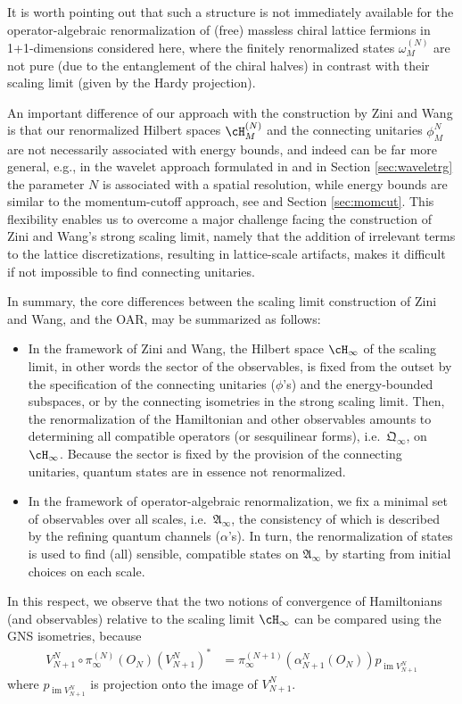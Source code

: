 \documentclass[a4paper, 11pt]{article}
\newcommand{\fA}{\mathfrak{A}}\newcommand{\cA}{\mathcal{A}}\newcommand{\dA}{\mathds{A}}\newcommand{\sA}{\mathscr{A}}
\newcommand{\fQ}{\mathfrak{Q}}
\DeclareMathOperator{\1}{\mathds{1}}
\DeclareMathOperator{\im}{im}
\begin{document}
It is worth pointing out that such a structure is not immediately available for the operator-algebraic renormalization of (free) massless chiral lattice fermions in 1+1-dimensions considered here, where the finitely renormalized states $\omega^{(N)}_{M}$ are not pure (due to the entanglement of the chiral halves) in contrast with their scaling limit (given by the Hardy projection).

An important difference of our approach with the construction by Zini and Wang is that our renormalized Hilbert spaces $\cH_{M}^{(N)}$ and the connecting unitaries $\phi^{N}_{M}$ are not necessarily associated with energy bounds, and indeed can be far more general, e.g., in the wavelet approach formulated in \cite{StottmeisterOperatorAlgebraicRenormalization} and in Section \ref{sec:waveletrg} the parameter $N$ is associated with a spatial resolution, while energy bounds are similar to the momentum-cutoff approach, see \cite{MorinelliScalingLimitsOf} and Section \ref{sec:momcut}. This flexibility enables us to overcome a major challenge facing the construction of Zini and Wang's strong scaling limit, namely that the addition of irrelevant terms to the lattice discretizations, resulting in lattice-scale artifacts, makes it difficult if not impossible to find connecting unitaries. 

In summary, the core differences between the scaling limit construction of Zini and Wang, and the OAR, may be summarized as follows: 
\begin{itemize}
	\item In the framework of Zini and Wang, the Hilbert space $\cH_{\infty}$ of the scaling limit, in other words the sector of the observables, is fixed from the outset by the specification of the connecting unitaries ($\phi$'s) and the energy-bounded subspaces, or by the connecting isometries in the strong scaling limit. Then, the renormalization of the Hamiltonian and other observables amounts to determining all compatible operators (or sesquilinear forms), i.e.~$\fQ_{\infty}$, on $\cH_{\infty}$. Because the sector is fixed by the provision of the connecting unitaries, quantum states are in essence not renormalized.
	\item In the framework of operator-algebraic renormalization, we fix a minimal set of observables over all scales, i.e.~$\fA_{\infty}$, the consistency of which is described by the refining quantum channels ($\alpha$'s). In turn, the renormalization of states is used to find (all) sensible, compatible states on $\fA_{\infty}$ by starting from initial choices on each scale.
\end{itemize}
In this respect, we observe that the two notions of convergence of Hamiltonians (and observables) relative to the scaling limit $\cH_{\infty}$ can be compared using the GNS isometries, because
\begin{align*}
V^{N}_{N+1}\circ \pi_{\infty}^{(N)}(O_{N})(V^{N}_{N+1})^{*} & \!=\!\pi_{\infty}^{(N+1)}(\alpha^{N}_{N+1}(O_{N}))p_{\im V^{N}_{N+1}}
\end{align*}
where $p_{\im V^{N}_{N+1}}$ is projection onto the image of $V^{N}_{N+1}$.
\end{document}
